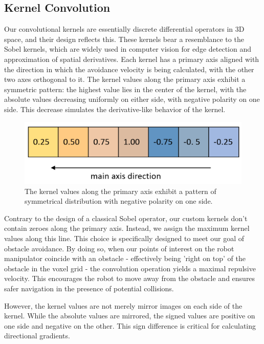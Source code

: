 \documentclass[a4paper]{article}
\begin{document}
\subsection{Kernel Convolution}

Our convolutional kernels are essentially discrete differential operators in 3D space, and their design reflects this. These kernels bear a resemblance to the Sobel kernels, which are widely used in computer vision for edge detection and approximation of spatial derivatives. Each kernel has a primary axis aligned with the direction in which the avoidance velocity is being calculated, with the other two axes orthogonal to it. The kernel values along the primary axis exhibit a symmetric pattern: the highest value lies in the center of the kernel, with the absolute values decreasing uniformly on either side, with negative polarity on one side. This decrease simulates the derivative-like behavior of the kernel.

\begin{figure}[H]
	\centering
	\includegraphics[width=0.8\linewidth]{kernel-mainvalues-colored.png}
	\caption{The kernel values along the primary axis exhibit a pattern of symmetrical distribution with negative polarity on one side.} 
	\label{Kernel main axis}
\end{figure}

Contrary to the design of a classical Sobel operator, our custom kernels don't contain zeroes along the primary axis. Instead, we assign the maximum kernel values along this line. This choice is specifically designed to meet our goal of obstacle avoidance. By doing so, when our points of interest on the robot manipulator coincide with an obstacle - effectively being 'right on top' of the obstacle in the voxel grid - the convolution operation yields a maximal repulsive velocity. This encourages the robot to move away from the obstacle and ensures safer navigation in the presence of potential collisions.

However, the kernel values are not merely mirror images on each side of the kernel. While the absolute values are mirrored, the signed values are positive on one side and negative on the other. This sign difference is critical for calculating directional gradients.
\end{document}
